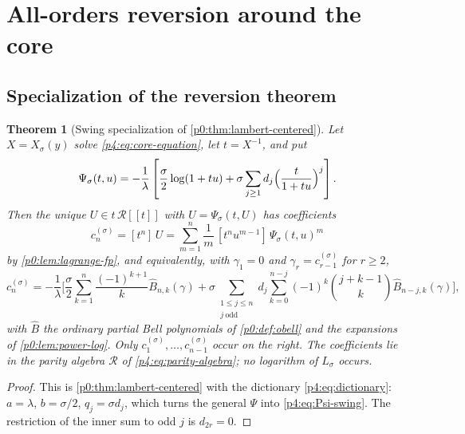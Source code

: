 \documentclass[11pt,a4paper,oneside]{book}
\theoremstyle{plain}
\newtheorem{theorem}{Theorem}[chapter]
\theoremstyle{definition}
\theoremstyle{remark}
\newcommand{\Coef}[1]{[#1]\,}
\newcommand{\OB}{\widehat{B}}
\newcommand{\Xcore}{X}
\begin{document}
\section{All-orders reversion around the core}
\label{p4:sec:reversion}

\subsection{Specialization of the reversion theorem}

\begin{theorem}[Swing specialization of \cref{p0:thm:lambert-centered}]
\label{p4:thm:reversion}
Let $\Xcore=\Xcore_\sigma(y)$ solve \cref{p4:eq:core-equation}, let
$t=\Xcore^{-1}$, and put
\begin{equation}
  \Psi_\sigma(t,u)=-\frac1\lambda\left[
    \frac\sigma2\log(1+tu)
    +\sigma\sum_{j\ge1}d_j\Bigl(\frac{t}{1+tu}\Bigr)^{j}\right].
  \label{p4:eq:Psi-swing}
\end{equation}
Then the unique $U\in t\,\mathscr R[[t]]$ with $U=\Psi_\sigma(t,U)$ has
coefficients
\begin{equation}
  c_n^{(\sigma)}=\Coef{t^n}U
  =\sum_{m=1}^{n}\frac1m\,\Coef{t^{n}u^{m-1}}\Psi_\sigma(t,u)^{m}
  \label{p4:eq:c-lagrange}
\end{equation}
by \cref{p0:lem:lagrange-fp}, and equivalently, with $\gamma_1=0$ and
$\gamma_r=c^{(\sigma)}_{r-1}$ for $r\ge2$,
\begin{equation}
  c^{(\sigma)}_n=-\frac1\lambda\Biggl[
   \frac\sigma2\sum_{k=1}^{n}\frac{(-1)^{k+1}}{k}\OB_{n,k}(\gamma)
   +\sigma\!\!\sum_{\substack{1\le j\le n\\ j\ \mathrm{odd}}}\!\! d_j
     \sum_{k=0}^{n-j}(-1)^{k}\binom{j+k-1}{k}\OB_{n-j,k}(\gamma)\Biggr],
  \label{p4:eq:c-bell}
\end{equation}
with $\OB$ the ordinary partial Bell polynomials of \cref{p0:def:obell} and
the expansions of \cref{p0:lem:power-log}.  Only
$c^{(\sigma)}_1,\ldots,c^{(\sigma)}_{n-1}$ occur on the right.  The
coefficients lie in the parity algebra $\mathscr R$ of
\cref{p4:eq:parity-algebra}; no logarithm of $L_\sigma$ occurs.
\end{theorem}

\begin{proof}
This is \cref{p0:thm:lambert-centered} with the dictionary
\cref{p4:eq:dictionary}: $a=\lambda$, $b=\sigma/2$, $q_j=\sigma d_j$, which
turns the general $\Psi$ into \cref{p4:eq:Psi-swing}.  The restriction of the
inner sum to odd $j$ is $d_{2r}=0$.
\end{proof}
\end{document}
